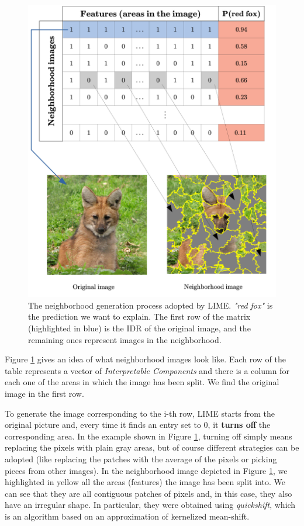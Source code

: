 \documentclass[12pt, twoside, a4paper]{report}
\begin{document}
\begin{figure}
\includegraphics[width=\textwidth]{images/neighborhood_gen.png} 
\caption{The neighborhood generation process adopted by LIME. \textit{"red fox"} is the prediction we want to explain. The first row of the matrix (highlighted in blue) is the IDR of the original image, and the remaining ones represent images in the neighborhood.}
\label{fig:neighborhood_generation}
\end{figure}

Figure \ref{fig:neighborhood_generation} gives an idea of what neighborhood images look like. Each row of the table represents a vector of \textit{Interpretable Components} and there is a column for each one of the areas in which the image has been split. We find the original image in the first row.

To generate the image corresponding to the i-th row, LIME starts from the original picture and, every time it finds an entry set to 0, it \textbf{turns off} the corresponding area. In the example shown in Figure \ref{fig:neighborhood_generation}, turning off simply means replacing the pixels with plain gray areas, but of course different strategies can be adopted (like replacing the patches with the average of the pixels or picking pieces from other images).
In the neighborhood image depicted in Figure \ref{fig:neighborhood_generation}, we highlighted in yellow all the areas (features) the image has been split into. We can see that they are all contiguous patches of pixels and, in this case, they also have an irregular shape. In particular, they were obtained using \textit{quickshift}\cite{quickshift}, which is an algorithm based on an approximation of kernelized mean-shift\cite{meanshift}.
\end{document}
